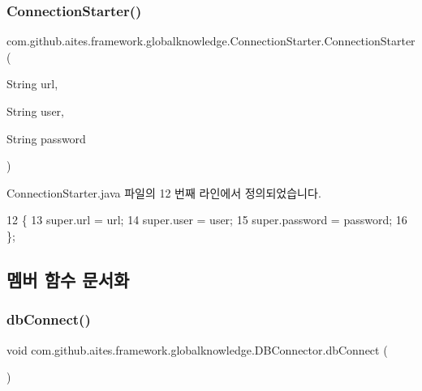 \subsubsection{\texorpdfstring{Connection\+Starter()}{ConnectionStarter()}}
{\footnotesize\ttfamily com.\+github.\+aites.\+framework.\+globalknowledge.\+Connection\+Starter.\+Connection\+Starter (\begin{DoxyParamCaption}\item[{String}]{url,  }\item[{String}]{user,  }\item[{String}]{password }\end{DoxyParamCaption})}



Connection\+Starter.\+java 파일의 12 번째 라인에서 정의되었습니다.


\begin{DoxyCode}
12                                                                       \{
13         super.url = url;
14         super.user = user;
15         super.password =  password;
16     \};
\end{DoxyCode}


\subsection{멤버 함수 문서화}
\mbox{\label{classcom_1_1github_1_1aites_1_1framework_1_1globalknowledge_1_1_d_b_connector_a108808207e33b613b470855bb2be9223}} 
\subsubsection{\texorpdfstring{db\+Connect()}{dbConnect()}}
{\footnotesize\ttfamily void com.\+github.\+aites.\+framework.\+globalknowledge.\+D\+B\+Connector.\+db\+Connect (\begin{DoxyParamCaption}{ }\end{DoxyParamCaption})\hspace{0.3cm}{\ttfamily [inherited]}}



